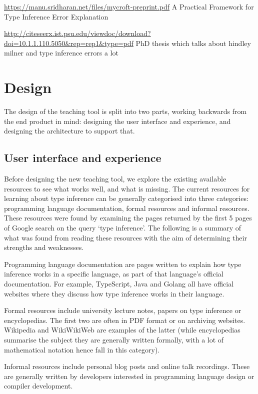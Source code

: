 \documentclass[a4paper,fleqn,12pt]{article}
\begin{document}
\underline{\href{https://manu.sridharan.net/files/mycroft-preprint.pdf}{https://manu.sridharan.net/files/mycroft-preprint.pdf}}
A Practical Framework for Type Inference Error Explanation

\underline{\href{http://citeseerx.ist.psu.edu/viewdoc/download?doi=10.1.1.110.5050\&rep=rep1\&type=pdf}{http://citeseerx.ist.psu.edu/viewdoc/download?doi=10.1.1.110.5050\&rep=rep1\&type=pdf}}
PhD thesis which talks about hindley milner and type inference errors a lot
\section{Design}\label{id:h.7ggvdxb04tzm}
The design of the teaching tool is split into two parts, working backwards from the end product in mind: designing the user interface and experience, and designing the architecture to support that.
\subsection{User interface and experience}\label{id:h.dr046u473e01}
Before designing the new teaching tool, we explore the existing available resources to see what works well, and what is missing. The current resources for learning about type inference can be generally categorised into three categories: programming language documentation, formal resources and informal resources. These resources were found by examining the pages returned by the first 5 pages of Google search on the query ‘type inference’. The following is a summary of what was found from reading these resources with the aim of determining their strengths and weaknesses.

Programming language documentation are pages written to explain how type inference works in a specific language, as part of that language’s official documentation. For example, TypeScript, Java and Golang all have official websites where they discuss how type inference works in their language.

Formal resources include university lecture notes, papers on type inference or encyclopedias. The first two are often in PDF format or on archiving websites. Wikipedia and WikiWikiWeb are examples of the latter (while encyclopedias summarise the subject they are generally written formally, with a lot of mathematical notation hence fall in this category).

Informal resources include personal blog posts and online talk recordings. These are generally written by developers interested in programming language design or compiler development.
\end{document}
